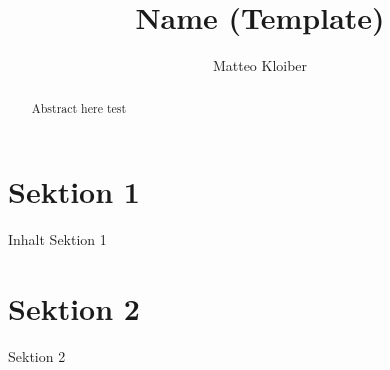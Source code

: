 \documentclass[a4paper]{article}
\title{Name (Template)}
\author{Matteo Kloiber}
\date{\creationDate}
\begin{document}
    \thispagestyle{fancy}
\maketitle

\begin{abstract}
    Abstract here test
\end{abstract}

\newpage
\tableofcontents
\newpage

\section{Sektion 1}
Inhalt Sektion 1 

\section{Sektion 2}
Sektion 2
\end{document}
